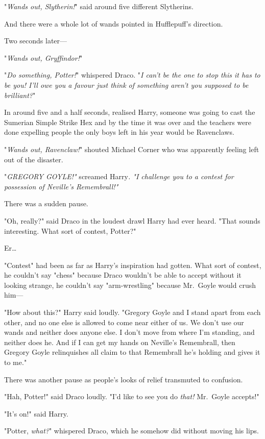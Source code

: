 "\emph{Wands out, Slytherin!}" said around five different Slytherins.

And there were a whole lot of wands pointed in Hufflepuff's direction.

Two seconds later---

"\emph{Wands out, Gryffindor!}"

"\emph{Do something, Potter!}" whispered Draco. "\emph{I can't be the one to 
stop this it has to be you! I'll owe you a favour just think of something 
aren't you supposed to be brilliant?}"

In around five and a half seconds, realised Harry, someone was going to cast 
the Sumerian Simple Strike Hex and by the time it was over and the teachers 
were done expelling people the only boys left in his year would be Ravenclaws.

"\emph{Wands out, Ravenclaw!}" shouted Michael Corner who was apparently 
feeling left out of the disaster.

"\emph{GREGORY GOYLE!"} screamed Harry\emph{. "I challenge you to a contest for 
possession of Neville's Remembrall!"}

There was a sudden pause.

"Oh, really?" said Draco in the loudest drawl Harry had ever heard. "That 
sounds interesting. What sort of contest, Potter?"

Er{\ldots}

"Contest" had been as far as Harry's inspiration had gotten. What sort of 
contest, he couldn't say "chess" because Draco wouldn't be able to accept 
without it looking strange, he couldn't say "arm-wrestling" because Mr.~Goyle 
would crush him---

"How about this?" Harry said loudly. "Gregory Goyle and I stand apart from each 
other, and no one else is allowed to come near either of us. We don't use our 
wands and neither does anyone else. I don't move from where I'm standing, and 
neither does he. And if I can get my hands on Neville's Remembrall, then 
Gregory Goyle relinquishes all claim to that Remembrall he's holding and gives 
it to me."

There was another pause as people's looks of relief transmuted to confusion.

"Hah, Potter!" said Draco loudly. "I'd like to see you do \emph{that!} 
Mr.~Goyle accepts!"

"It's on!" said Harry.

"Potter, \emph{what?}" whispered Draco, which he somehow did without moving his 
lips.

